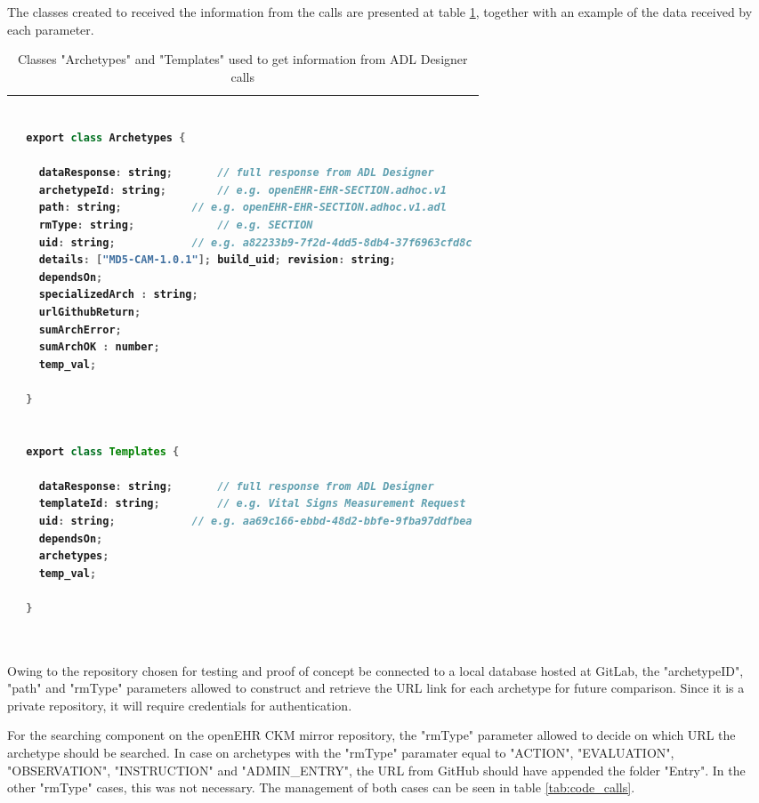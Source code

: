 \documentclass[mim_thesis.tex]{subfiles}
\begin{document}
The classes created to received the information from the calls are presented at table \ref{tab:adl_designer_calls}, together with an example of the data received by each parameter.

\begin{table}[H]
\caption{Classes "Archetypes" and "Templates" used to get information from ADL Designer calls}
\label{tab:adl_designer_calls}
\centering
\begin{tabular}{l}
\toprule[2pt]
\begin{lstlisting}[language=java]
  
  export class Archetypes {
  
    dataResponse: string;  		// full response from ADL Designer
    archetypeId: string; 	 	// e.g. openEHR-EHR-SECTION.adhoc.v1
    path: string; 			// e.g. openEHR-EHR-SECTION.adhoc.v1.adl
    rmType: string; 			// e.g. SECTION
    uid: string; 			// e.g. a82233b9-7f2d-4dd5-8db4-37f6963cfd8c
    details: ["MD5-CAM-1.0.1"]; build_uid; revision: string;
    dependsOn;
    specializedArch : string;
    urlGithubReturn;
    sumArchError;
    sumArchOK : number;
    temp_val;
    
  }


  export class Templates {
  
    dataResponse: string;  		// full response from ADL Designer
    templateId: string;  		// e.g. Vital Signs Measurement Request
    uid: string; 			// e.g. aa69c166-ebbd-48d2-bbfe-9fba97ddfbea
    dependsOn;
    archetypes;
    temp_val;
    
  }
  
\end{lstlisting}
\tabularnewline \bottomrule[2pt]
\end{tabular}
\end{table}

Owing to the repository chosen for testing and proof of concept be connected to a local database hosted at GitLab, the "archetypeID", "path" and "rmType" parameters allowed to construct and retrieve the URL link for each archetype for future comparison. Since it is a private repository, it will require credentials for authentication. 

For the searching component on the openEHR CKM mirror repository, the "rmType" parameter allowed to decide on which URL the archetype should be searched. In case on archetypes with the "rmType" paramater equal to "ACTION", "EVALUATION", "OBSERVATION", "INSTRUCTION" and "ADMIN\_ENTRY", the URL from GitHub should have appended the folder "Entry". In the other "rmType" cases, this was not necessary. The management of both cases can be seen in table \ref{tab:code_calls}. 
\end{document}
